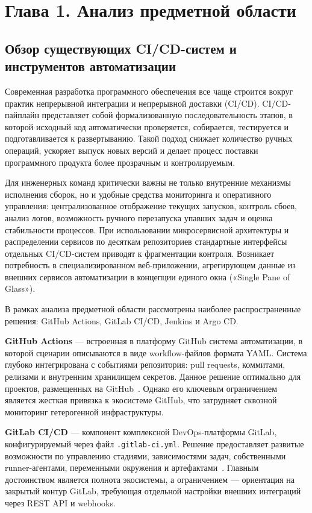 \section*{Глава 1. Анализ предметной области}

\subsection{Обзор существующих CI/CD-систем и инструментов автоматизации}

Современная разработка программного обеспечения все чаще строится вокруг практик непрерывной интеграции и непрерывной доставки (CI/CD). CI/CD-пайплайн представляет собой формализованную последовательность этапов, в которой исходный код автоматически проверяется, собирается, тестируется и подготавливается к развертыванию. Такой подход снижает количество ручных операций, ускоряет выпуск новых версий и делает процесс поставки программного продукта более прозрачным и контролируемым.

Для инженерных команд критически важны не только внутренние механизмы исполнения сборок, но и удобные средства мониторинга и оперативного управления: централизованное отображение текущих запусков, контроль сбоев, анализ логов, возможность ручного перезапуска упавших задач и оценка стабильности процессов. При использовании микросервисной архитектуры и распределении сервисов по десяткам репозиториев стандартные интерфейсы отдельных CI/CD-систем приводят к фрагментации контроля. Возникает потребность в специализированном веб-приложении, агрегирующем данные из внешних сервисов автоматизации в концепции единого окна («Single Pane of Glass»).

В рамках анализа предметной области рассмотрены наиболее распространенные решения: GitHub Actions, GitLab CI/CD, Jenkins и Argo CD.

\textbf{GitHub Actions} --- встроенная в платформу GitHub система автоматизации, в которой сценарии описываются в виде workflow-файлов формата YAML. Система глубоко интегрирована с событиями репозитория: pull requests, коммитами, релизами и внутренним хранилищем секретов. Данное решение оптимально для проектов, размещенных на GitHub~\cite{github_actions_docs}. Однако его ключевым ограничением является жесткая привязка к экосистеме GitHub, что затрудняет сквозной мониторинг гетерогенной инфраструктуры.

\textbf{GitLab CI/CD} --- компонент комплексной DevOps-платформы GitLab, конфигурируемый через файл \texttt{.gitlab-ci.yml}. Решение предоставляет развитые возможности по управлению стадиями, зависимостями задач, собственными runner-агентами, переменными окружения и артефактами~\cite{gitlab_cicd_docs}. Главным достоинством является полнота экосистемы, а ограничением --- ориентация на закрытый контур GitLab, требующая отдельной настройки внешних интеграций через REST API и webhooks.

